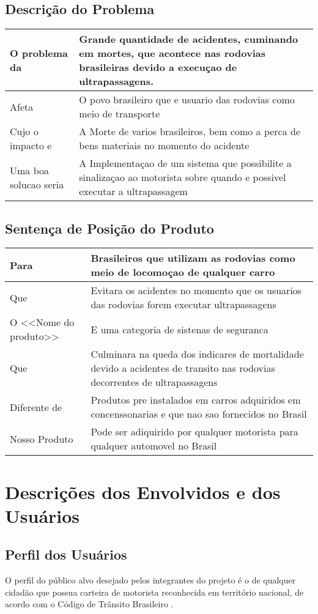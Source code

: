 \subsection{Descrição do Problema}
\begin{tabular}{| l |  p{7cm} |}
\hline
O problema da & Grande quantidade de acidentes, cuminando em mortes, que acontece nas rodovias brasileiras devido a execuçao de ultrapassagens.  \\
\hline
Afeta & O povo brasileiro que e usuario das rodovias como meio de transporte \\
\hline
Cujo o impacto e & A Morte de varios brasileiros, bem como a perca de bens materiais no momento do acidente\\
\hline
Uma boa solucao seria & A Implementaçao de um sistema que possibilite a sinalizaçao ao motorista sobre quando e possivel executar a ultrapassagem \\
\hline
\end{tabular}

\subsection{Sentença de Posição do Produto}
\begin{tabular}{| l |  p{7cm} |}
\hline
Para & Brasileiros que utilizam as rodovias como meio de locomoçao de qualquer carro \\
\hline
Que & Evitara os acidentes no momento que os usuarios das rodovias forem executar ultrapassagens \\
\hline
O <<Nome do produto>> & E uma categoria de sistenas de seguranca\\
\hline
Que & Culminara na queda dos indicares de mortalidade devido a acidentes de transito nas rodovias decorrentes de ultrapassagens \\
\hline
Diferente de & Produtos pre instalados em carros adquiridos em concenssonarias e que nao sao fornecidos no Brasil  \\
\hline
Nosso Produto & Pode ser adiquirido por qualquer motorista para qualquer automovel no Brasil\\
\hline
\end{tabular}


\section{Descrições dos Envolvidos e dos Usuários}

\subsection{Perfil dos Usuários}
O perfil do público alvo desejado pelos integrantes do projeto é o de qualquer cidadão que possua carteira de motorista reconhecida em território nacional, de acordo com o Código de Trânsito Brasileiro \cite{ctb}.

